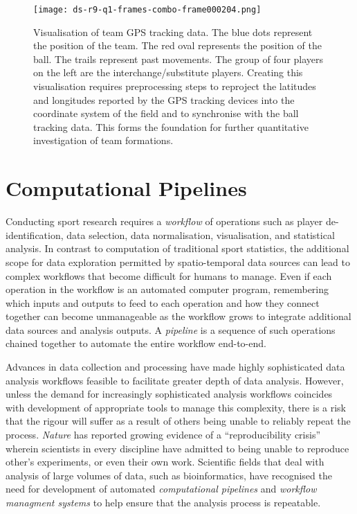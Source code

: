 \begin{figure}[!htb]
\centering
\texttt{[image: ds-r9-q1-frames-combo-frame000204.png]}
\caption{Visualisation of team GPS tracking data. The blue dots represent the position of the team. The red oval represents the position of the ball. The trails represent past movements. The group of four players on the left are the interchange/substitute players. Creating this visualisation requires preprocessing steps to reproject the latitudes and longitudes reported by the GPS tracking devices into the coordinate system of the field and to synchronise with the ball tracking data. This forms the foundation for further quantitative investigation of team formations.
\label{fig:introsample}}
\end{figure}

\section{Computational Pipelines}

Conducting sport research requires a \textit{workflow} of operations such as player de-identification, data selection, data normalisation, visualisation, and statistical analysis. In contrast to computation of traditional sport statistics, the additional scope for data exploration permitted by spatio-temporal data sources can lead to complex workflows that become difficult for humans to manage. Even if each operation in the workflow is an automated computer program, remembering which inputs and outputs to feed to each operation and how they connect together can become unmanageable as the workflow grows to integrate additional data sources and analysis outputs. A \textit{pipeline} is a sequence of such operations chained together to automate the entire workflow end-to-end.


Advances in data collection and processing have made highly sophisticated data analysis workflows feasible to facilitate greater depth of data analysis. However, unless the demand for increasingly sophisticated analysis workflows coincides with development of appropriate tools to manage this complexity, there is a risk that the rigour will suffer as a result of others being unable to reliably repeat the process. \textit{Nature} has reported growing evidence of a ``reproducibility crisis'' \cite{Baker2016} wherein scientists in every discipline have admitted to being unable to reproduce other's experiments, or even their own work. Scientific fields that deal with analysis of large volumes of data, such as bioinformatics, have recognised the need for development of automated \textit{computational pipelines} \cite{Goodstadt2010} and \textit{workflow managment systems} \cite{Oinn2004, Hull2006} to help ensure that the analysis process is repeatable.

